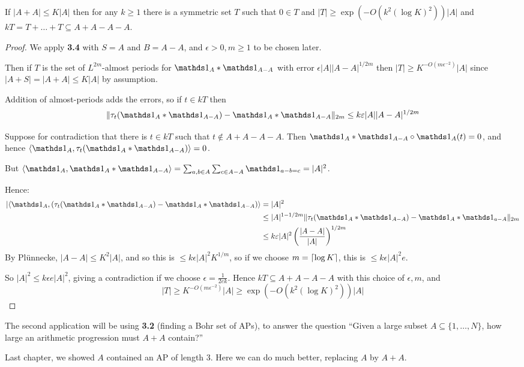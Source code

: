 \documentclass[10pt,a4paper]{article}
\begin{document}
\begin{theorem}
  If $|A+A| \leq K|A|$ then for any $k \geq 1$ there is a symmetric set $T$ such that $0 \in T$ and $|T| \geq \exp(-O(k^2(\log K)^2)) |A|$ and $kT = T+\ldots+T \subseteq A+A-A-A$.
\end{theorem}
\begin{proof}
  We apply \textbf{3.4} with $S=A$ and $B=A-A$, and $\epsilon > 0, m\geq 1$ to be chosen later.

  Then if $T$ is the set of $L^{2m}$-almost periods for $\one_A \ast \one_{A-A}$ with error $\epsilon |A||A-A|^{1/2m}$ then $|T| \geq K^{-O(m\epsilon^{-2})}|A|$ since $|A+S| = |A+A| \leq K|A|$ by assumption.

  Addition of almost-periods adds the errors, so if $t \in kT$ then
  \[\norm{\tau_t(\one_A \ast \one_{A-A}) - \one_A\ast \one_{A-A}}_{2m} \leq k\epsilon |A||A-A|^{1/2m}\]

  Suppose for contradiction that there is $t \in kT$ such that $t \notin A+A-A-A$. Then $\one_{A}\ast\one_{A-A}\circ \one_A(t) = 0$, and hence $\angle{\one_A, \tau_t(\one_A \ast \one_{A-A})} = 0$.

  But $\angle{\one_A, \one_A\ast \one_{A-A}} = \sum_{a,b \in A} \sum_{c \in A-A} \one_{a-b=c} = |A|^2$.

  Hence:
  \begin{align*}
    |\angle{\one_A, (\tau_t(\one_A \ast \one_{A-A})-\one_A \ast \one_{A-A})} &= |A|^2\\
    &\leq |A|^{1-1/2m} \norm{\tau_t(\one_A \ast \one_{A-A})-\one_A \ast \one_{a-A}}_{2m}\\
    &\leq k\epsilon |A|^2 \left(\frac{|A-A|}{|A|}\right)^{1/2m}
  \end{align*}
  By Pl\"unnecke, $|A-A| \leq K^2|A|$, and so this is $\leq k\epsilon |A|^2 K^{1/m}$, so if we choose $m = \lceil \log K \rceil$, this is $\leq k\epsilon |A|^2 e$.

  So $|A|^2 \leq k\epsilon e |A|^2$, giving a contradiction if we choose $\epsilon = \frac{1}{2ek}$. Hence $kT \subseteq A+A-A-A$ with this choice of $\epsilon, m$, and
  \[|T| \geq K^{-O(m\epsilon^{-2})}|A| \geq \exp(-O(k^2(\log K)^2))|A|\]
\end{proof}

The second application will be using \textbf{3.2} (finding a Bohr set of APs), to answer the question ``Given a large subset $A \subseteq\{1, \ldots, N\}$, how large an arithmetic progression must $A+A$ contain?''

Last chapter, we showed $A$ contained an AP of length 3. Here we can do much better, replacing $A$ by $A+A$.
\end{document}
